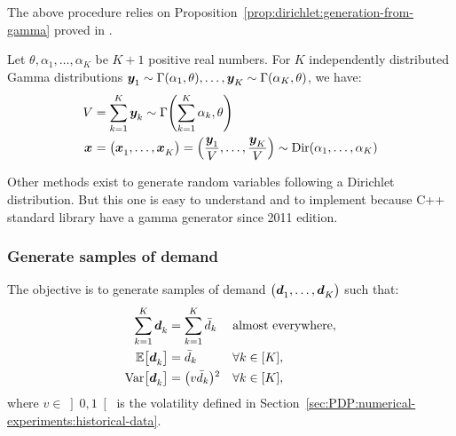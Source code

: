 The above procedure relies on Proposition~\ref{prop:dirichlet:generation-from-gamma} proved in \cite{Devroye1986}.

\begin{prop}\label{prop:dirichlet:generation-from-gamma}
  Let $\theta,\alpha_1,\ldots,\alpha_K$ be $K+1$ positive real numbers.
  For $K$ independently distributed Gamma distributions
  $\va y_1\sim\Gamma\bracket{\alpha_1,\theta},\ldots,\va y_K\sim\Gamma\bracket{\alpha_K,\theta}$,
  we have:
  \begin{subequations}
    \begin{align}
      V &= \sum_{k=1}^K \va y_k \sim \Gamma\bracket{\sum_{k=1}^K \alpha_k,\theta}
      \\
      \va x &= \bracket{\va x_1,\ldots,\va x_K} = \bracket{\frac{\va y_1}{V},\ldots,\frac{\va y_K}{V}} \sim \Dir\bracket{\alpha_1,\ldots,\alpha_K}
    \end{align}
  \end{subequations}
\end{prop}

Other methods exist to generate random variables following a Dirichlet distribution. But this one is easy to understand and to implement because C++ standard library have a gamma generator since 2011 edition.




\subsubsection{Generate samples of demand}

The objective is to generate samples of demand $\bracket{\va\demand_1,\ldots,\va\demand_K}$ such that:
\begin{subequations}
  \begin{align}
    \sum_{k=1}^K \va\demand_k &= \sum_{k=1}^K \bar{\demand}_k && \mbox{almost everywhere},
    \\
    \espe\sqbracket{\va\demand_k} &= \bar{\demand}_k && \forall k\in\range{K},
    \\
    \vari\sqbracket{\va\demand_k} &= \bracket{v\bar{\demand}_k}^2 && \forall k\in\range{K},
  \end{align}
\end{subequations}
where $v\in\left]0,1\right[$ is the volatility defined in Section~\ref{sec:PDP:numerical-experiments:historical-data}.


\medskip

